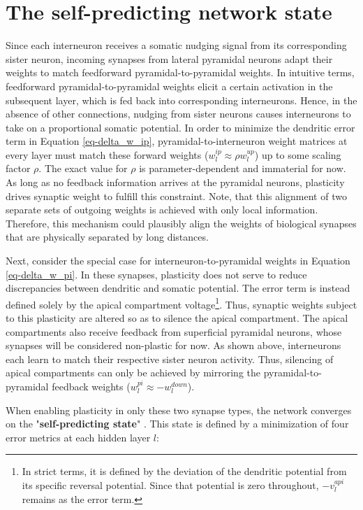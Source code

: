 \section{The self-predicting network state}\label{sec-selfpred}

Since each interneuron receives a somatic nudging signal from its corresponding sister neuron, incoming synapses from
lateral pyramidal neurons adapt their weights to match feedforward pyramidal-to-pyramidal weights. In intuitive terms,
feedforward pyramidal-to-pyramidal weights elicit a certain activation in the subsequent layer, which is fed back into
corresponding interneurons. Hence, in the absence of other connections, nudging from sister neurons causes interneurons
to take on a proportional somatic potential. In order to minimize the dendritic error term in Equation
\ref{eq-delta_w_ip}, pyramidal-to-interneuron weight matrices at every layer must match these forward weights ($w_l^{ip}
\approx \rho w_l^{up}$) up to some scaling factor $\rho$. The exact value for $\rho$ is parameter-dependent and
immaterial for now. As long as no feedback information arrives at the pyramidal neurons, plasticity drives synaptic
weight to fulfill this constraint. Note, that this alignment of two separate sets of outgoing weights is achieved with
only local information. Therefore, this mechanism could plausibly align the weights of biological synapses that are
physically separated by long distances.

Next, consider the special case for interneuron-to-pyramidal weights in Equation \ref{eq-delta_w_pi}. In these synapses,
plasticity does not serve to reduce discrepancies between dendritic and somatic potential. The error term is instead
defined solely by the apical compartment voltage\footnote{In strict terms, it is defined by the deviation of the
dendritic potential from its specific reversal potential. Since that potential is zero throughout, $- v_l^{api}$ remains
as the error term.}. Thus, synaptic weights subject to this plasticity are altered so as to silence the apical
compartment. The apical compartments also receive feedback from superficial pyramidal neurons, whose synapses will be
considered non-plastic for now. As shown above, interneurons each learn to match their respective sister neuron
activity. Thus, silencing of apical compartments can only be achieved by mirroring the pyramidal-to-pyramidal feedback
weights ($w_l^{pi} \approx -w_l^{down}$).

When enabling plasticity in only these two synapse types, the network converges on the "\textbf{self-predicting state}"
\citep{sacramento2018dendritic}. This state is defined by a minimization of four error metrics at each hidden layer $l$:

